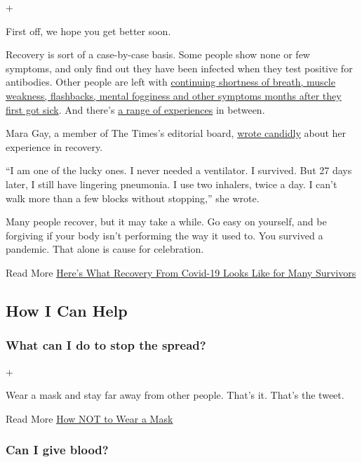 +

First off, we hope you get better soon.

Recovery is sort of a case-by-case basis. Some people show none or few
symptoms, and only find out they have been infected when they test
positive for antibodies. Other people are left with
\href{https://www.nytimes.com/2020/05/10/world/europe/coronavirus-italy-recovery.html}{continuing
shortness of breath, muscle weakness, flashbacks, mental fogginess and
other symptoms months after they first got sick}. And there's
\href{https://www.nytimes.com/2020/03/04/us/coronavirus-recovery.html}{a
range of experiences} in between.

Mara Gay, a member of The Times's editorial board,
\href{https://www.nytimes.com/2020/05/14/opinion/coronavirus-young-people.html}{wrote
candidly} about her experience in recovery.

``I am one of the lucky ones. I never needed a ventilator. I survived.
But 27 days later, I still have lingering pneumonia. I use two inhalers,
twice a day. I can't walk more than a few blocks without stopping,'' she
wrote.

Many people recover, but it may take a while. Go easy on yourself, and
be forgiving if your body isn't performing the way it used to. You
survived a pandemic. That alone is cause for celebration.

 Read More
\href{https://www.nytimes.com/2020/07/01/health/coronavirus-recovery-survivors.html}{Here's
What Recovery From Covid-19 Looks Like for Many Survivors}

\hypertarget{how-i-can-help}{%
\subsection{How I Can Help}\label{how-i-can-help}}

\hypertarget{what-can-i-do-to-stop-the-spread}{%
\subsubsection{What can I do to stop the
spread?}\label{what-can-i-do-to-stop-the-spread}}

+

Wear a mask and stay far away from other people. That's it. That's the
tweet.

 Read More
\href{https://www.nytimes.com/2020/04/08/well/live/coronavirus-face-mask-mistakes.html}{How
NOT to Wear a Mask}

\hypertarget{can-i-give-blood}{%
\subsubsection{Can I give blood?}\label{can-i-give-blood}}

